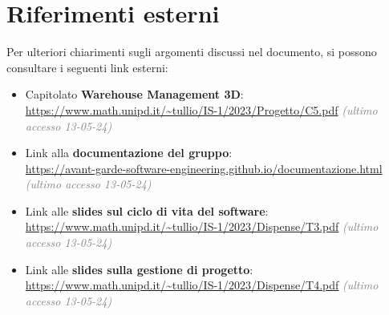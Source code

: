 \section{Riferimenti esterni}\label{sec:riferimenti_esterni}
Per ulteriori chiarimenti sugli argomenti discussi nel documento, si possono consultare i seguenti link esterni:
\begin{itemize}
    \item Capitolato \textbf{Warehouse Management 3D}:\\
    \url{https://www.math.unipd.it/~tullio/IS-1/2023/Progetto/C5.pdf} \textcolor{gray}{\textit{(ultimo accesso 13-05-24)}}
    \item Link alla \textbf{documentazione del gruppo}:\\
    \url{https://avant-garde-software-engineering.github.io/documentazione.html} \textcolor{gray}{\textit{(ultimo accesso 13-05-24)}}
    \item Link alle \textbf{slides sul ciclo di vita del software}:\\
    \url{https://www.math.unipd.it/~tullio/IS-1/2023/Dispense/T3.pdf} \textcolor{gray}{\textit{(ultimo accesso 13-05-24)}}
    \item Link alle \textbf{slides sulla gestione di progetto}:\\
    \url{https://www.math.unipd.it/~tullio/IS-1/2023/Dispense/T4.pdf} \textcolor{gray}{\textit{(ultimo accesso 13-05-24)}} 
\end{itemize}